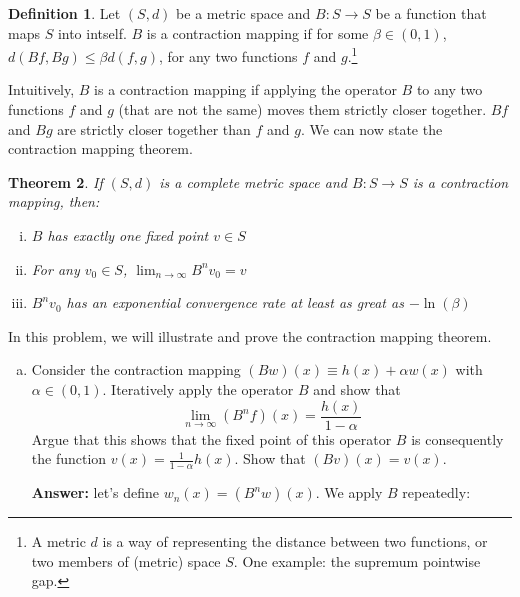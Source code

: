 \documentclass[11pt]{extarticle}
\theoremstyle{plain}
\newtheorem{thm}{Theorem}
\theoremstyle{definition}
\newtheorem{defn}[thm]{Definition}
\begin{document}
\begin{enumerate}[(a)]
\begin{defn}
	Let $(S, d)$ be a metric space and $B: S \to S$ be a function that maps $S$ into intself. $B$ is a contraction mapping if for some $\beta \in (0, 1)$, $d(Bf, Bg) \leq \beta d(f, g)$, for any two functions $f$ and $g$.\footnote{
		A metric $d$ is a way of representing the distance between two functions, or two members of (metric) space $S$. One example: the supremum pointwise gap.
	}
	
\end{defn}


\vspace{5mm}
\noindent
Intuitively, $B$ is a contraction mapping if applying the operator $B$ to any two functions $f$ and $g$ (that are not the same) moves them strictly closer together. $Bf$ and $Bg$ are strictly closer together than $f$ and $g$. We can now state the contraction mapping theorem. 


\vspace{5mm}
\begin{thm}

	If $(S, d)$ is a complete metric space and $B: S \to S$ is a contraction mapping, then: 
	\begin{enumerate}[(i)]
		\item $B$ has exactly one fixed point $v \in S$
		\item For any $v_0 \in S$, $\lim_{n \to \infty} B^n v_0 = v$
		\item $B^n v_0$ has an exponential convergence rate at least as great as $- \ln(\beta)$
	\end{enumerate}
	
\end{thm}


\vspace{5mm}
\noindent
In this problem, we will illustrate and prove the contraction mapping theorem.

\begin{enumerate}[(a)]
\item Consider the contraction mapping $(Bw)(x) \equiv h(x) + \alpha w(x)$ with $\alpha \in (0, 1)$. Iteratively apply the operator $B$ and show that 
\begin{equation*}
	\lim_{n \to \infty} (B^n f)(x) = \frac{h(x)}{1-\alpha}
\end{equation*}
Argue that this shows that the fixed point of this operator $B$ is consequently the function $v(x) = \frac{1}{1-\alpha} h(x)$. Show that $(Bv)(x) = v(x)$. 

\textbf{Answer:} let’s define \( w_n(x) = (B^n w)(x) \). We apply \( B \) repeatedly:


\end{enumerate}
\end{enumerate}
\end{document}
